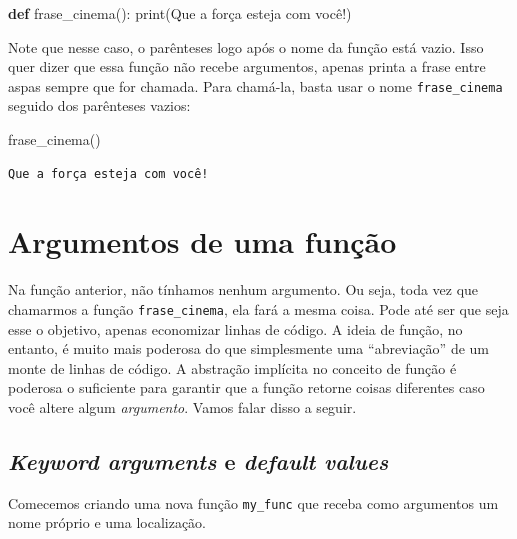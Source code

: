 \documentclass[
  brazilian,
  letterpaper,
  DIV=11,
  numbers=noendperiod]{scrreprt}
\newenvironment{Shaded}{\begin{snugshade}}{\end{snugshade}}
\newcommand{\BuiltInTok}[1]{\textcolor[rgb]{0.00,0.23,0.31}{#1}}
\newcommand{\KeywordTok}[1]{\textcolor[rgb]{0.00,0.23,0.31}{\textbf{#1}}}
\newcommand{\NormalTok}[1]{\textcolor[rgb]{0.00,0.23,0.31}{#1}}
\newcommand{\StringTok}[1]{\textcolor[rgb]{0.13,0.47,0.30}{#1}}
\begin{document}
\begin{Shaded}
\begin{Highlighting}[]
\KeywordTok{def}\NormalTok{ frase\_cinema():}
    \BuiltInTok{print}\NormalTok{(}\StringTok{\textquotesingle{}Que a força esteja com você!\textquotesingle{}}\NormalTok{)}
\end{Highlighting}
\end{Shaded}

Note que nesse caso, o parênteses logo após o nome da função está vazio.
Isso quer dizer que essa função não recebe argumentos, apenas printa a
frase entre aspas sempre que for chamada. Para chamá-la, basta usar o
nome \texttt{frase\_cinema} seguido dos parênteses vazios:

\begin{Shaded}
\begin{Highlighting}[]
\NormalTok{frase\_cinema()}
\end{Highlighting}
\end{Shaded}

\begin{verbatim}
Que a força esteja com você!
\end{verbatim}

\section{Argumentos de uma função}\label{argumentos-de-uma-funuxe7uxe3o}

Na função anterior, não tínhamos nenhum argumento. Ou seja, toda vez que
chamarmos a função \texttt{frase\_cinema}, ela fará a mesma coisa. Pode
até ser que seja esse o objetivo, apenas economizar linhas de código. A
ideia de função, no entanto, é muito mais poderosa do que simplesmente
uma ``abreviação'' de um monte de linhas de código. A abstração
implícita no conceito de função é poderosa o suficiente para garantir
que a função retorne coisas diferentes caso você altere algum
\emph{argumento}. Vamos falar disso a seguir.

\subsection{\texorpdfstring{\emph{Keyword arguments} e \emph{default
values}}{Keyword arguments e default values}}\label{keyword-arguments-e-default-values}

Comecemos criando uma nova função \texttt{my\_func} que receba como
argumentos um nome próprio e uma localização.
\end{document}
